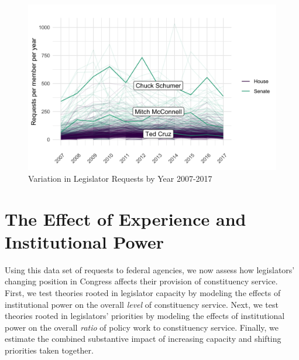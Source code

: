 \documentclass[12pt]{article}
\begin{document}
\begin{figure}
\centering
\caption{Variation in Legislator Requests by Year 2007-2017} \label{f:peryear} 
\begin{minipage}{\textwidth}
\includegraphics[width = \textwidth]{figs/counts-per-year-1}
\end{minipage}
\end{figure}






\section{The Effect of Experience and Institutional Power}\label{s:results} 

Using this data set of requests to federal agencies, we now assess how legislators' changing position in Congress affects their provision of constituency service. First, we test theories rooted in legislator capacity by modeling the effects of institutional power on the overall \textit{level} of constituency service. Next, we test theories rooted in legislators' priorities by modeling the effects of institutional power on the overall \textit{ratio} of policy work to constituency service. Finally, we estimate the combined substantive impact of increasing capacity and shifting priorities taken together. 
\end{document}
